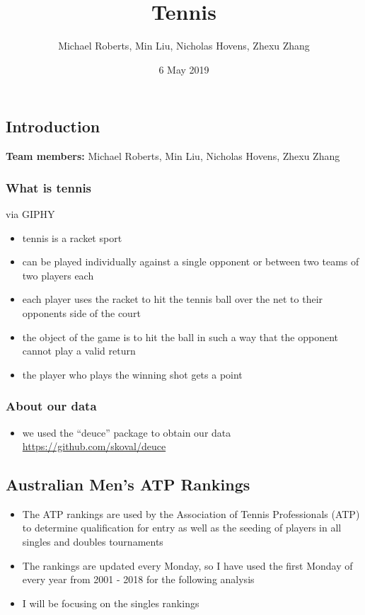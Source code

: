 \documentclass[]{article}
\title{Tennis}
\author{Michael Roberts, Min Liu, Nicholas Hovens, Zhexu Zhang}
\date{6 May 2019}
\providecommand{\tightlist}{%
  \setlength{\itemsep}{0pt}\setlength{\parskip}{0pt}}
\begin{document}
\maketitle

\subsection{Introduction}\label{introduction}

\textbf{Team members:} Michael Roberts, Min Liu, Nicholas Hovens, Zhexu
Zhang

\subsubsection{What is tennis}\label{what-is-tennis}

via GIPHY

\begin{itemize}
\tightlist
\item
  tennis is a racket sport
\item
  can be played individually against a single opponent or between two
  teams of two players each
\item
  each player uses the racket to hit the tennis ball over the net to
  their opponents side of the court
\item
  the object of the game is to hit the ball in such a way that the
  opponent cannot play a valid return
\item
  the player who plays the winning shot gets a point
\end{itemize}

\subsubsection{About our data}\label{about-our-data}

\begin{itemize}
\tightlist
\item
  we used the ``deuce'' package to obtain our data
  \url{https://github.com/skoval/deuce}
\end{itemize}

\subsection{Australian Men's ATP
Rankings}\label{australian-mens-atp-rankings}

\begin{itemize}
\tightlist
\item
  The ATP rankings are used by the Association of Tennis Professionals
  (ATP) to determine qualification for entry as well as the seeding of
  players in all singles and doubles tournaments
\item
  The rankings are updated every Monday, so I have used the first Monday
  of every year from 2001 - 2018 for the following analysis
\item
  I will be focusing on the singles rankings
\end{itemize}
\end{document}
